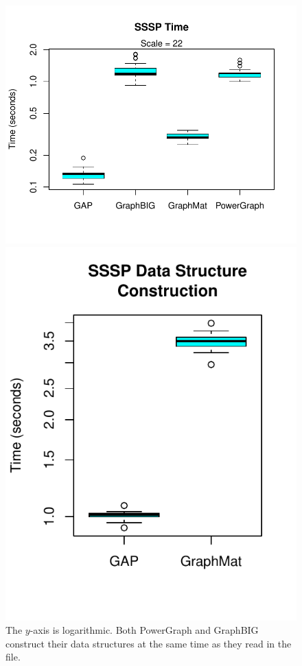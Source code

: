 \documentclass{llncs}
\begin{document}
\begin{figure}
	\centering
	\begin{minipage}{0.59\linewidth}
		\includegraphics[width=\linewidth, trim=0 36pt 18pt 0, clip]{graphics/sssp_time.pdf}
	\end{minipage}
	\begin{minipage}{0.365\linewidth}
		\includegraphics[width=\linewidth, trim=0 36pt 18pt 0, clip]{graphics/sssp_dsc.pdf}
	\end{minipage}
	\caption{The $y$-axis is logarithmic. Both PowerGraph and GraphBIG construct their data structures at the same time as they read in the file.}
	\label{fig:sssp-time}
\end{figure}
\end{document}
